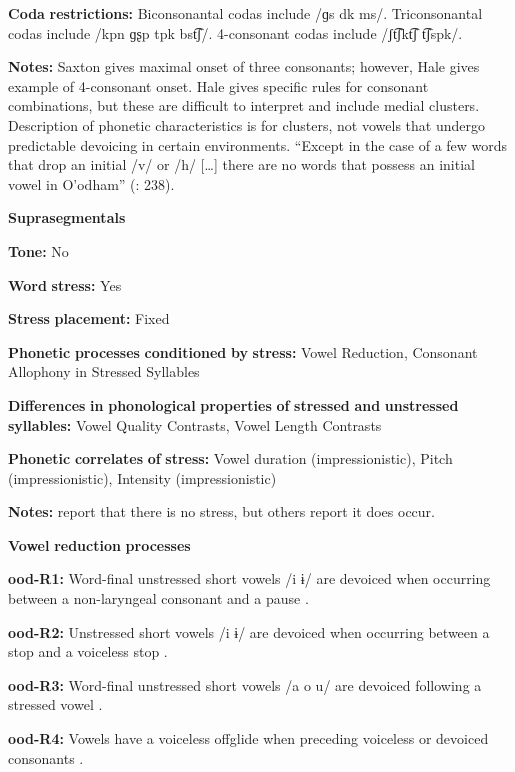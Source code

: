 \textbf{Coda} \textbf{restrictions:} Biconsonantal codas include /ɡs dk ms/. Triconsonantal codas include /kpn ɡʂp tpk bst͡ʃ/. 4-consonant codas include /ʃt͡ʃkt͡ʃ t͡ʃspk/.

\textbf{Notes:} Saxton gives maximal onset of three consonants; however, Hale gives example of 4-consonant onset. Hale gives specific rules for consonant combinations, but these are difficult to interpret and include medial clusters. Description of phonetic characteristics is for clusters, not vowels that undergo predictable devoicing in certain environments. “Except in the case of a few words that drop an initial /v/ or /h/ […] there are no words that possess an initial vowel in O’odham” (\citealt{DoloresMathiot1991}: 238).

\textbf{Suprasegmentals}

\textbf{Tone:} No

\textbf{Word} \textbf{stress:} Yes

\textbf{Stress} \textbf{placement:} Fixed

\textbf{Phonetic} \textbf{processes} \textbf{conditioned} \textbf{by} \textbf{stress:} Vowel Reduction, Consonant Allophony in Stressed Syllables

\textbf{Differences} \textbf{in} \textbf{phonological} \textbf{properties} \textbf{of} \textbf{stressed} \textbf{and} \textbf{unstressed} \textbf{syllables:} Vowel Quality Contrasts, Vowel Length Contrasts

\textbf{Phonetic} \textbf{correlates} \textbf{of} \textbf{stress:} Vowel duration (impressionistic), Pitch (impressionistic), Intensity (impressionistic)

\textbf{Notes:} \citet{DoloresMathiot1991} report that there is no stress, but others report it does occur.

\textbf{Vowel} \textbf{reduction} \textbf{processes}

\textbf{ood-R1:} Word-final unstressed short vowels /i ɨ/ are devoiced when occurring between a non-laryngeal consonant and a pause \citep[31]{Saxton1963}.

\textbf{ood-R2:} Unstressed short vowels /i ɨ/ are devoiced when occurring between a stop and a voiceless stop \citep[31]{Saxton1963}.

\textbf{ood-R3:} Word-final unstressed short vowels /a o u/ are devoiced following a stressed vowel \citep[31]{Saxton1963}.

\textbf{ood-R4:} Vowels have a voiceless offglide when preceding voiceless or devoiced consonants \citep[31]{Saxton1963}.

